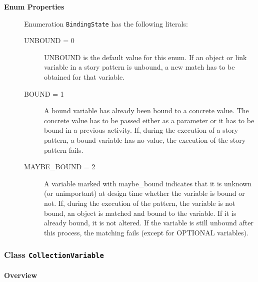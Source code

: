 	


\begin{description}

	\item[\textbf{Enum Properties}] Enumeration \texttt{BindingState} has the following literals:

	\begin{description}
		
		\item[UNBOUND = 0]
		\hspace{\fill}
		\nopagebreak
		
UNBOUND is the default value for this enum. If an object or link variable in a story pattern is unbound, a new match has to be obtained for that variable.	

		\item[BOUND = 1]
		\hspace{\fill}
		\nopagebreak
		
A bound variable has already been bound to a concrete value. The concrete value has to be passed either as a parameter or it has to be bound in a previous activity. If, during the execution of a story pattern, a bound variable has no value, the execution of the story pattern fails.	

		\item[MAYBE\_BOUND = 2]
		\hspace{\fill}
		\nopagebreak
		
A variable marked with maybe\_bound indicates that it is unknown (or unimportant) at design time whether the variable is bound or not. If, during the execution of the pattern, the variable is not bound, an object is matched and bound to the variable. If it is already bound, it is not altered. If the variable is still unbound after this process, the matching fails (except for OPTIONAL variables).	
 
	\end{description}

\end{description}



\subsubsection{\Large{Class \bfseries \texttt{CollectionVariable}\normalfont}}
\label{cls:storydiagrams::patterns::CollectionVariable} 
\paragraph{Overview}

